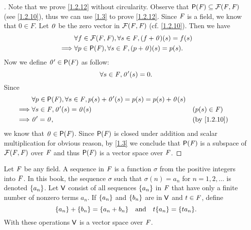 \begin{proof}[]
	Note that we prove \cref{1.2.12} without circularity.
	Observe that \(\ps{\F} \subseteq \fs(\F, \F)\) (see \cref{1.2.10}), thus we can use \cref{1.3} to prove \cref{1.2.12}.
	Since \(\mathit{F}\) is a field, we know that \(0 \in F\).
	Let \(\mathit{0}\) be the zero vector in \(\mathcal{F}(\mathit{F}, \mathit{F})\) (cf. \cref{1.2.10}).
	Then we have
	\begin{align*}
		         & \forall f \in \fs(\F, \F), \forall s \in \F, (f + \zv)(s) = f(s) \\
		\implies & \forall p \in \ps{\F}, \forall s \in \F, (p + \zv)(s) = p(s).
	\end{align*}
	Now we define \(\zv' \in \ps{F}\) as follow:
	\[
		\forall s \in \mathit{F}, \mathit{0}'(s) = 0.
	\]
	Since
	\begin{align*}
		         & \forall p \in \ps{\F}, \forall s \in \F, p(s) + \zv'(s) = p(s) = p(s) + \zv(s)                                \\
		\implies & \forall s \in \F, \zv'(s) = \zv(s)                                             &  & (p(s) \in \F)             \\
		\implies & \zv' = \zv,                                                                    &  & \text{(by \cref{1.2.10})}
	\end{align*}
	we know that \(\zv \in \ps{\F}\).
	Since \(\ps{\F}\) is closed under addition and scalar multiplication for obvious reason, by \cref{1.3} we conclude that \(\ps{\F}\) is a subspace of \(\mathcal{F}(\mathit{F}, \mathit{F})\) over \(\mathit{F}\) and thus \(\ps{\F}\) is a vector space over \(\mathit{F}\).
\end{proof}

\begin{eg}\label{1.2.13}
	Let \(\mathit{F}\) be any field.
	A sequence in \(\mathit{F}\) is a function \(\sigma\) from the positive integers into \(\mathit{F}\).
	In this book, the sequence \(\sigma\) such that \(\sigma(n) = a_n\) for \(n = 1, 2, \dots\) is denoted \(\left\lbrace a_n\right\rbrace\).
	Let \(\mathsf{V}\) consist of all sequences \(\left\lbrace a_n\right\rbrace\) in \(\mathit{F}\) that have only a finite number of nonzero terms \(a_n\).
	If \(\left\lbrace a_n\right\rbrace\) and \(\left\lbrace b_n\right\rbrace\) are in \(\mathsf{V}\) and \(t \in \mathit{F}\), define
	\[
		\set{a_n} + \set{b_n} = \set{a_n + b_n} \quad \text{and} \quad t\set{a_n} = \set{ta_n}.
	\]
	With these operations \(\mathsf{V}\) is a vector space over \(\mathit{F}\).
\end{eg}

